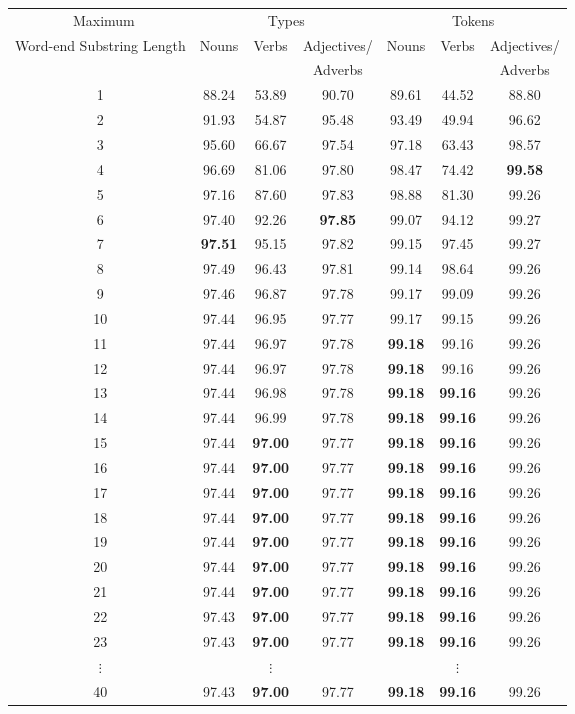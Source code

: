 \documentclass[a4paper,10pt,twoside]{article}
\begin{document}
\begin{table}[tbh]
\begin{center}
\begin{tabular}{|c|ccc|ccc|}
\hline
 Maximum  & \multicolumn{3}{|c|}{Types} & \multicolumn{3}{|c|}{Tokens} \\
Word-end Substring Length & Nouns & Verbs & Adjectives/ & Nouns & Verbs & Adjectives/ \\ 
&  &  & Adverbs &  &  & Adverbs \\ 
\hline

1 & 88.24 & 53.89 & 90.70 & 89.61 & 44.52 & 88.80 \\
2 & 91.93 & 54.87 & 95.48 & 93.49 & 49.94 & 96.62 \\
3 & 95.60 & 66.67 & 97.54 & 97.18 & 63.43 & 98.57 \\
4 & 96.69 & 81.06 & 97.80 & 98.47 & 74.42 & \textbf{99.58} \\
5 & 97.16 & 87.60 & 97.83 & 98.88 & 81.30 & 99.26 \\
6 & 97.40 & 92.26 & \textbf{97.85} & 99.07 & 94.12 & 99.27 \\
7 & \textbf{97.51} & 95.15 & 97.82 & 99.15 & 97.45 & 99.27 \\
8 & 97.49 & 96.43 & 97.81 & 99.14 & 98.64 & 99.26 \\
9 & 97.46 & 96.87 & 97.78 & 99.17 & 99.09 & 99.26 \\
10 & 97.44 & 96.95 & 97.77 & 99.17 & 99.15 & 99.26 \\
11 & 97.44 & 96.97 & 97.78 & \textbf{99.18} & 99.16 & 99.26 \\
12 & 97.44 & 96.97 & 97.78 & \textbf{99.18} & 99.16 & 99.26 \\
13 & 97.44 & 96.98 & 97.78 & \textbf{99.18} & \textbf{99.16} & 99.26 \\
14 & 97.44 & 96.99 & 97.78 & \textbf{99.18} & \textbf{99.16} & 99.26 \\
15 & 97.44 & \textbf{97.00} & 97.77 & \textbf{99.18} & \textbf{99.16} & 99.26 \\
16 & 97.44 & \textbf{97.00} & 97.77 & \textbf{99.18} & \textbf{99.16} & 99.26 \\
17 & 97.44 & \textbf{97.00} & 97.77 & \textbf{99.18} & \textbf{99.16} & 99.26 \\
18 & 97.44 & \textbf{97.00} & 97.77 & \textbf{99.18} & \textbf{99.16} & 99.26 \\
19 & 97.44 & \textbf{97.00} & 97.77 & \textbf{99.18} & \textbf{99.16} & 99.26 \\
20 & 97.44 & \textbf{97.00} & 97.77 & \textbf{99.18} & \textbf{99.16} & 99.26 \\
21 & 97.44 & \textbf{97.00} & 97.77 & \textbf{99.18} & \textbf{99.16} & 99.26 \\
22 & 97.43 & \textbf{97.00} & 97.77 & \textbf{99.18} & \textbf{99.16} & 99.26 \\
23 & 97.43 & \textbf{97.00} & 97.77 & \textbf{99.18} & \textbf{99.16} & 99.26 \\
$\vdots$ & & $\vdots$ &   & & $\vdots$ &  \\
40 & 97.43 & \textbf{97.00} & 97.77 & \textbf{99.18} & \textbf{99.16} & 99.26 \\


\end{tabular}
\end{center}
\end{table}
\end{document}
